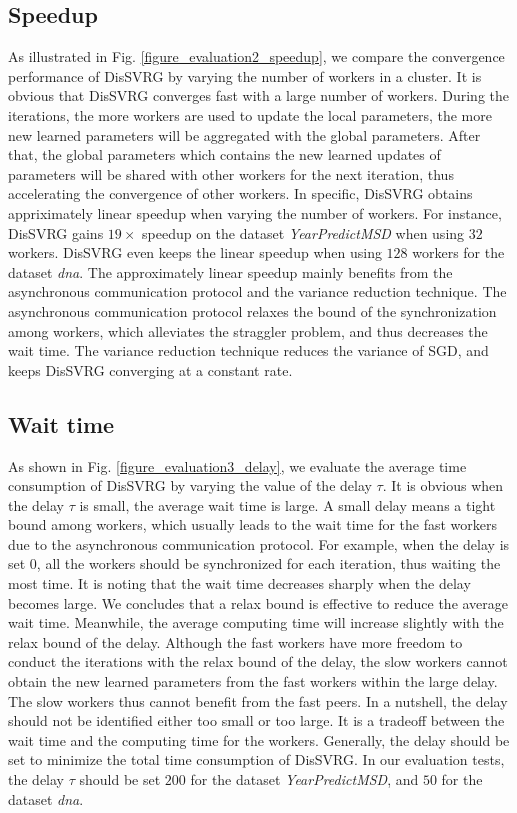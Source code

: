\documentclass[10pt,journal,finalsubmission,compsoc]{IEEEtran}
\begin{document}
\subsection{Speedup}
As illustrated in Fig. \ref{figure_evaluation2_speedup},  we compare the convergence performance of DisSVRG by varying the number of workers in a cluster. It is obvious that DisSVRG converges fast with a large number of workers.  During the iterations, the more workers are used to update the local parameters, the more new learned parameters will be aggregated with the global parameters. After that,  the global parameters which contains the new learned updates of parameters will be shared with other workers for the next iteration, thus accelerating the convergence of other workers.  In specific,  DisSVRG obtains appriximately linear speedup when varying the number of workers. For instance, DisSVRG gains $19\times$ speedup on the dataset \emph{YearPredictMSD} when using $32$ workers. DisSVRG even keeps the linear speedup when using $128$ workers for the dataset \emph{dna}. The approximately linear speedup mainly benefits from the asynchronous communication protocol and the variance reduction technique. The asynchronous communication protocol relaxes the bound of the synchronization among workers, which alleviates the straggler problem, and thus decreases the wait time. The variance reduction technique reduces the variance of SGD, and keeps DisSVRG converging at a constant rate. 


\subsection{Wait time}
As shown in Fig. \ref{figure_evaluation3_delay}, we evaluate the average time consumption of DisSVRG by varying the value of the delay $\tau$. It is obvious when the delay $\tau$ is small, the average wait time is large. A small delay means a tight bound among workers, which usually leads to the wait time for the fast workers due to the asynchronous communication protocol. For example, when the delay is set $0$, all the workers should be synchronized for each iteration, thus waiting the most time. It is noting that the wait time decreases sharply when the delay becomes large. We concludes that a relax bound is effective to reduce the average wait time. Meanwhile, the average computing time will increase slightly with the relax bound of the delay. Although the fast workers have more freedom to conduct the iterations with the relax bound of the delay, the slow workers cannot obtain the new learned parameters from the fast workers within the large delay. The slow workers thus cannot  benefit from the fast peers.   In a nutshell, the delay should not be identified either too small or too large. It is a tradeoff between the wait time and the computing time for the workers. Generally, the delay should be set to minimize the total time consumption of DisSVRG. In our evaluation tests, the delay $\tau$ should be set $200$ for the dataset \emph{YearPredictMSD}, and $50$ for the dataset \emph{dna}. 
\end{document}

